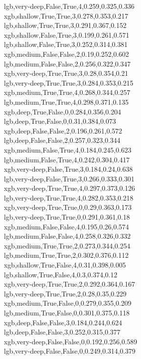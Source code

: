 lgb,very-deep,False,True,4,0.259,0.325,0.336 \\
xgb,shallow,True,True,3,0.278,0.353,0.217 \\
lgb,shallow,True,True,3,0.291,0.367,0.152 \\
xgb,shallow,False,True,3,0.199,0.261,0.571 \\
lgb,shallow,False,True,3,0.252,0.314,0.381 \\
xgb,medium,False,False,2,0.19,0.252,0.602 \\
lgb,medium,False,False,2,0.256,0.322,0.347 \\
xgb,very-deep,True,True,3,0.28,0.354,0.21 \\
lgb,very-deep,True,True,3,0.284,0.353,0.215 \\
xgb,medium,True,True,4,0.268,0.344,0.257 \\
lgb,medium,True,True,4,0.298,0.371,0.135 \\
xgb,deep,True,False,0,0.284,0.356,0.204 \\
lgb,deep,True,False,0,0.31,0.384,0.073 \\
xgb,deep,False,False,2,0.196,0.261,0.572 \\
lgb,deep,False,False,2,0.257,0.323,0.344 \\
xgb,medium,False,True,4,0.184,0.245,0.623 \\
lgb,medium,False,True,4,0.242,0.304,0.417 \\
xgb,very-deep,False,True,3,0.184,0.24,0.638 \\
lgb,very-deep,False,True,3,0.266,0.333,0.301 \\
xgb,very-deep,True,True,4,0.297,0.373,0.126 \\
lgb,very-deep,True,True,4,0.282,0.353,0.218 \\
xgb,very-deep,True,True,0,0.29,0.363,0.173 \\
lgb,very-deep,True,True,0,0.291,0.361,0.18 \\
xgb,medium,False,False,4,0.195,0.26,0.574 \\
lgb,medium,False,False,4,0.258,0.326,0.332 \\
xgb,medium,True,True,2,0.273,0.344,0.254 \\
lgb,medium,True,True,2,0.302,0.376,0.112 \\
xgb,shallow,True,False,4,0.31,0.398,0.005 \\
lgb,shallow,True,False,4,0.3,0.374,0.12 \\
xgb,very-deep,True,True,2,0.292,0.364,0.167 \\
lgb,very-deep,True,True,2,0.28,0.35,0.229 \\
xgb,medium,True,False,0,0.279,0.355,0.209 \\
lgb,medium,True,False,0,0.301,0.375,0.118 \\
xgb,deep,False,False,3,0.184,0.244,0.624 \\
lgb,deep,False,False,3,0.252,0.315,0.377 \\
xgb,very-deep,False,False,0,0.192,0.256,0.589 \\
lgb,very-deep,False,False,0,0.249,0.314,0.379
